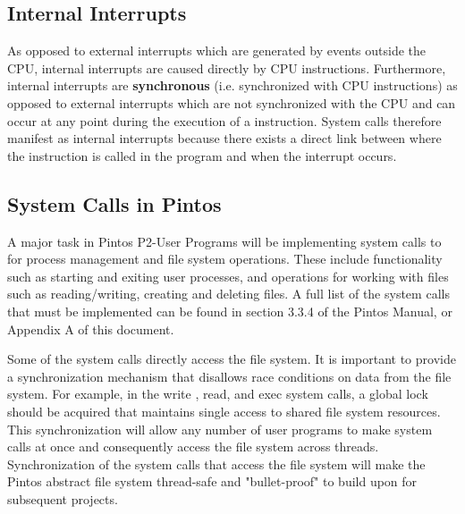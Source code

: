 \documentclass[11pt, letterpaper]{article}
\begin{document}
\subsection{Internal Interrupts}
As opposed to external interrupts which are generated by events outside the CPU, internal interrupts are caused directly by CPU instructions. Furthermore, internal interrupts are \textbf{synchronous} (i.e. synchronized with CPU instructions) as opposed to external interrupts which are not synchronized with the CPU and can occur at any point during the execution of a instruction. System calls therefore manifest as internal interrupts because there exists a direct link between where the instruction is called in the program and when the interrupt occurs.

\subsection{System Calls in Pintos}
A major task in Pintos P2-User Programs will be implementing system calls to for process management and file system operations. These include functionality such as starting and exiting user processes, and operations for working with files such as reading/writing, creating and deleting files. A full list of the system calls that must be implemented can be found in section 3.3.4 of the Pintos Manual, or Appendix A of this document.

Some of the system calls directly access the file system. It is important to provide a synchronization mechanism that disallows race conditions on data from the file system. For example, in the write , read, and exec  system calls, a global lock should be acquired that maintains single access to shared file system resources. This synchronization will allow any number of user programs to make system calls at once and consequently access the file system across threads. Synchronization of the system calls that access the file system will make the Pintos abstract file system thread-safe and "bullet-proof" to build upon for subsequent projects. 
\end{document}

